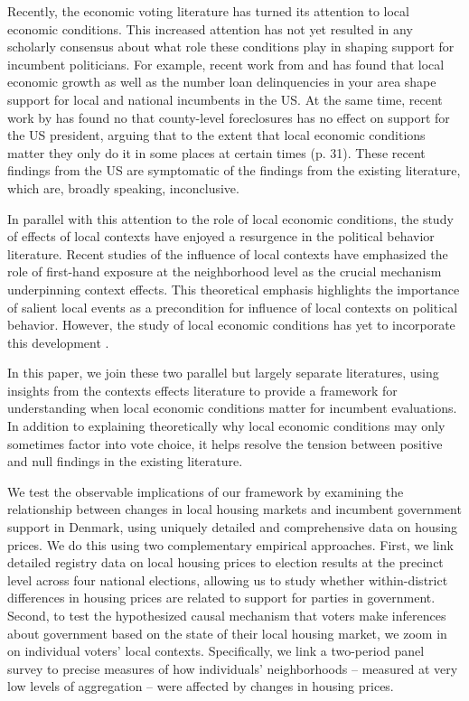 \documentclass[12pt,a4paper]{article}
\begin{document}
	Recently, the economic voting literature has turned its attention to local economic conditions. This increased attention has not yet resulted in any scholarly consensus about what role these conditions play in shaping support for incumbent politicians. For example, recent work from \cite{warshaw2017economic} and \cite{healy2017presidential} has found that local economic growth as well as the number loan delinquencies in your area shape support for local and national incumbents in the US. At the same time, recent work by \cite{hall2017economic} has found no that county-level foreclosures has no effect on support for the US president, arguing that to the extent that local economic conditions matter they only do it in some places at certain times (p. 31). These recent findings from the US are symptomatic of the findings from the existing literature, which are, broadly speaking, inconclusive.
	
	In parallel with this attention to the role of local economic conditions, the study of effects of local contexts have enjoyed a resurgence in the political behavior literature. Recent studies of the influence of local contexts have emphasized the role of first-hand exposure at the neighborhood level as the crucial mechanism underpinning context effects. This theoretical emphasis highlights the importance of salient local events as a precondition for influence of local contexts on political behavior. However, the study of local economic conditions has yet to incorporate this development \citep[though see][]{bisgaard2016reconsidering,reeves2012ecologies}.
	
	In this paper, we join these two parallel but largely separate literatures, using insights from the contexts effects literature to provide a framework for understanding when local economic conditions matter for incumbent evaluations. In addition to explaining theoretically why local economic conditions may only sometimes factor into vote choice, it helps resolve the tension between positive and null findings in the existing literature.
	
	We test the observable implications of our framework by examining the relationship between changes in local housing markets and incumbent government support in Denmark, using uniquely detailed and comprehensive data on housing prices. We do this using two complementary empirical approaches. First, we link detailed registry data on local housing prices to election results at the precinct level across four national elections, allowing us to study whether within-district differences in housing prices are related to support for parties in government. Second, to test the hypothesized causal mechanism that voters make inferences about government based on the state of their local housing market, we zoom in on individual voters' local contexts. Specifically, we link a two-period panel survey to precise measures of how individuals' neighborhoods -- measured at very low levels of aggregation -- were affected by changes in housing prices.
	
\end{document}
